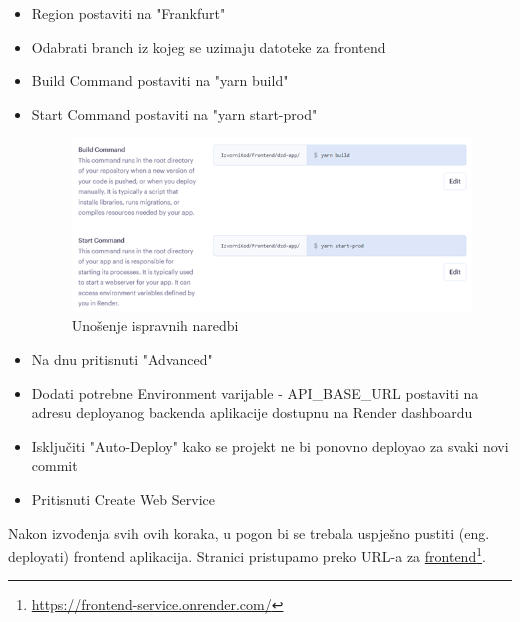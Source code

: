 \begin{itemize}
\begin{figure}[H]
    			\label{fig:fillDataFront}
    			\end{figure}
                    \item Region postaviti na "Frankfurt"
                    \item Odabrati branch iz kojeg se uzimaju datoteke za frontend
                    \item Build Command postaviti na "yarn build"
                    \item Start Command postaviti na "yarn start-prod"
                    \begin{figure}[H]
    			\includegraphics[]{slike/buildFront.png}
    			\centering
    			\caption{Unošenje ispravnih naredbi}
    			\label{fig:buildFrontCommands}
    			\end{figure}\textbf{}
                    \item Na dnu pritisnuti "Advanced"
                    \item Dodati potrebne Environment varijable - API\_BASE\_URL postaviti na adresu deployanog backenda aplikacije dostupnu na Render dashboardu
                    \item Isključiti "Auto-Deploy" kako se projekt ne bi ponovno deployao za svaki novi commit
                    \item Pritisnuti Create Web Service
                \end{itemize}

                Nakon izvođenja svih ovih koraka, u pogon bi se trebala uspješno pustiti (eng. deployati) frontend aplikacija. Stranici pristupamo preko URL-a za \underline{frontend}\footnote{\url{https://frontend-service.onrender.com/}}.